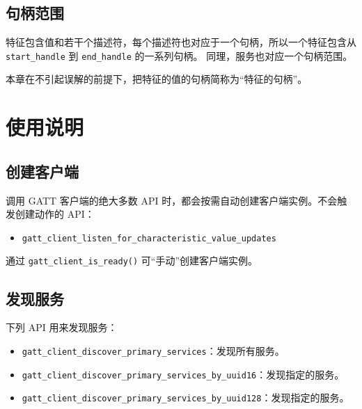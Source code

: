 \documentclass[
  12pt,
]{book}
\providecommand{\tightlist}{%
  \setlength{\itemsep}{0pt}\setlength{\parskip}{0pt}}
\begin{document}
\hypertarget{ux53e5ux67c4ux8303ux56f4}{%
\subsection{句柄范围}\label{ux53e5ux67c4ux8303ux56f4}}

特征包含值和若干个描述符，每个描述符也对应于一个句柄，所以一个特征包含从 \texttt{start\_handle} 到 \texttt{end\_handle} 的一系列句柄。
同理，服务也对应一个句柄范围。

本章在不引起误解的前提下，把特征的值的句柄简称为``特征的句柄''。

\hypertarget{ux4f7fux7528ux8bf4ux660e-4}{%
\section{使用说明}\label{ux4f7fux7528ux8bf4ux660e-4}}

\hypertarget{ux521bux5efaux5ba2ux6237ux7aef}{%
\subsection{创建客户端}\label{ux521bux5efaux5ba2ux6237ux7aef}}

调用 GATT 客户端的绝大多数 API 时，都会按需自动创建客户端实例。不会触发创建动作的 API：

\begin{itemize}
\tightlist
\item
  \texttt{gatt\_client\_listen\_for\_characteristic\_value\_updates}
\end{itemize}

通过 \texttt{gatt\_client\_is\_ready()} 可``手动''创建客户端实例。

\hypertarget{ux53d1ux73b0ux670dux52a1}{%
\subsection{发现服务}\label{ux53d1ux73b0ux670dux52a1}}

下列 API 用来发现服务：

\begin{itemize}
\item
  \texttt{gatt\_client\_discover\_primary\_services}：发现所有服务。
\item
  \texttt{gatt\_client\_discover\_primary\_services\_by\_uuid16}：发现指定的服务。
\item
  \texttt{gatt\_client\_discover\_primary\_services\_by\_uuid128}：发现指定的服务。
\end{itemize}
\end{document}
